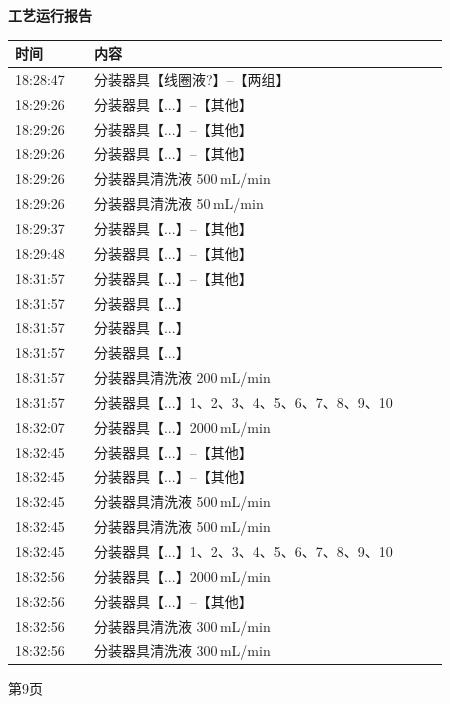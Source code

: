 \documentclass[UTF8,10pt,a4paper,fontset=fandol]{ctexart}
\begin{document}
\newpage

\noindent
\begin{minipage}[t]{0.47\linewidth}
\centering
\textbf{工艺运行报告}

\vspace{2pt}
\scriptsize
\begin{tabular}{|p{0.16\linewidth}|p{0.72\linewidth}|}
\hline
时间 & 内容 \\ \hline
18:28:47 & 分装器具【线圈液?】--【两组】 \\ \hline
18:29:26 & 分装器具【...】--【其他】 \\ \hline
18:29:26 & 分装器具【...】--【其他】 \\ \hline
18:29:26 & 分装器具【...】--【其他】 \\ \hline
18:29:26 & 分装器具清洗液 500\,mL/min \\ \hline
18:29:26 & 分装器具清洗液 50\,mL/min \\ \hline
18:29:37 & 分装器具【...】--【其他】 \\ \hline
18:29:48 & 分装器具【...】--【其他】 \\ \hline
18:31:57 & 分装器具【...】--【其他】 \\ \hline
18:31:57 & 分装器具【...】 \\ \hline
18:31:57 & 分装器具【...】 \\ \hline
18:31:57 & 分装器具【...】 \\ \hline
18:31:57 & 分装器具清洗液 200\,mL/min \\ \hline
18:31:57 & 分装器具【...】1、2、3、4、5、6、7、8、9、10 \\ \hline
18:32:07 & 分装器具【...】2000\,mL/min \\ \hline
18:32:45 & 分装器具【...】--【其他】 \\ \hline
18:32:45 & 分装器具【...】--【其他】 \\ \hline
18:32:45 & 分装器具清洗液 500\,mL/min \\ \hline
18:32:45 & 分装器具清洗液 500\,mL/min \\ \hline
18:32:45 & 分装器具【...】1、2、3、4、5、6、7、8、9、10 \\ \hline
18:32:56 & 分装器具【...】2000\,mL/min \\ \hline
18:32:56 & 分装器具【...】--【其他】 \\ \hline
18:32:56 & 分装器具清洗液 300\,mL/min \\ \hline
18:32:56 & 分装器具清洗液 300\,mL/min \\ \hline
\end{tabular}

\vspace{2pt}
\tiny 第9页
\end{minipage}
\end{document}
